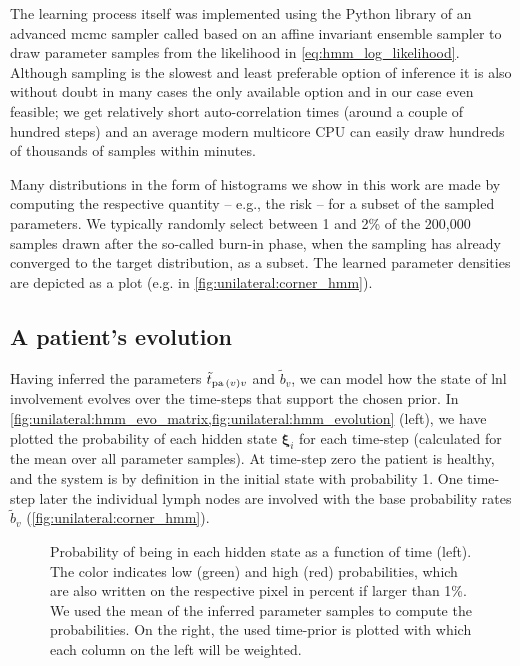 \documentclass[\relativeRoot/main.tex]{subfiles}
\begin{document}
The learning process itself was implemented using the Python library of an advanced \gls{mcmc} sampler called  \cite{foreman-mackey_emcee_2013} based on an affine invariant ensemble sampler \cite{goodman_ensemble_2010} to draw parameter samples from the likelihood in \cref{eq:hmm_log_likelihood}. Although sampling is the slowest and least preferable option of inference it is also without doubt in many cases the only available option and in our case even feasible; we get relatively short auto-correlation times (around a couple of hundred steps) and an average modern multicore CPU can easily draw hundreds of thousands of samples within minutes.

Many distributions in the form of histograms we show in this work are made by computing the respective quantity -- e.g., the risk -- for a subset of the sampled parameters. We typically randomly select between 1 and 2\% of the 200,000 samples drawn after the so-called burn-in phase, when the sampling has already converged to the target distribution, as a subset. The learned parameter densities are depicted as a  \cite{foreman-mackey_cornerpy_2016} plot (e.g. in \cref{fig:unilateral:corner_hmm}).

\subsection{A patient's evolution}
\label{subsec:unilateral:application:evolution}

Having inferred the parameters $\tilde{t}_{\operatorname{pa}{(v)}v}$ and $\tilde{b}_v$, we can model how the state of \gls{lnl} involvement evolves over the time-steps that support the chosen prior. In \cref{fig:unilateral:hmm_evo_matrix,fig:unilateral:hmm_evolution} (left), we have plotted the probability of each hidden state $\boldsymbol{\xi}_i$ for each time-step (calculated for the mean over all parameter samples). At time-step zero the patient is healthy, and the system is by definition in the initial state with probability 1. One time-step later the individual lymph nodes are involved with the base probability rates $\tilde{b}_v$ (\cref{fig:unilateral:corner_hmm}).

\begin{figure}
    \centering
    \def\svgwidth{1.0\textwidth}
    
    \caption{Probability of being in each hidden state as a function of time (left). The color indicates low (green) and high (red) probabilities, which are also written on the respective pixel in percent if larger than 1\%. We used the mean of the inferred parameter samples to compute the probabilities. On the right, the used time-prior is plotted with which each column on the left will be weighted.}
    \label{fig:unilateral:hmm_evo_matrix}
\end{figure}
\end{document}
